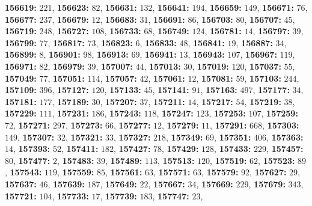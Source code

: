 \textsf{\bfseries 156619:} $221$, \textsf{\bfseries 156623:} $82$, \textsf{\bfseries 156631:} $132$, \textsf{\bfseries 156641:} $194$, \textsf{\bfseries 156659:} $149$, \textsf{\bfseries 156671:} $76$, \textsf{\bfseries 156677:} $237$, \textsf{\bfseries 156679:} $12$, \textsf{\bfseries 156683:} $31$, \textsf{\bfseries 156691:} $86$, \textsf{\bfseries 156703:} $80$, \textsf{\bfseries 156707:} $45$, \textsf{\bfseries 156719:} $248$, \textsf{\bfseries 156727:} $108$, \textsf{\bfseries 156733:} $68$, \textsf{\bfseries 156749:} $124$, \textsf{\bfseries 156781:} $14$, \textsf{\bfseries 156797:} $39$, \textsf{\bfseries 156799:} $77$, \textsf{\bfseries 156817:} $73$, \textsf{\bfseries 156823:} $6$, \textsf{\bfseries 156833:} $48$, \textsf{\bfseries 156841:} $19$, \textsf{\bfseries 156887:} $34$, \textsf{\bfseries 156899:} $8$, \textsf{\bfseries 156901:} $98$, \textsf{\bfseries 156913:} $69$, \textsf{\bfseries 156941:} $13$, \textsf{\bfseries 156943:} $107$, \textsf{\bfseries 156967:} $119$, \textsf{\bfseries 156971:} $82$, \textsf{\bfseries 156979:} $39$, \textsf{\bfseries 157007:} $44$, \textsf{\bfseries 157013:} $30$, \textsf{\bfseries 157019:} $120$, \textsf{\bfseries 157037:} $55$, \textsf{\bfseries 157049:} $77$, \textsf{\bfseries 157051:} $114$, \textsf{\bfseries 157057:} $42$, \textsf{\bfseries 157061:} $12$, \textsf{\bfseries 157081:} $59$, \textsf{\bfseries 157103:} $244$, \textsf{\bfseries 157109:} $396$, \textsf{\bfseries 157127:} $120$, \textsf{\bfseries 157133:} $45$, \textsf{\bfseries 157141:} $91$, \textsf{\bfseries 157163:} $497$, \textsf{\bfseries 157177:} $34$, \textsf{\bfseries 157181:} $177$, \textsf{\bfseries 157189:} $30$, \textsf{\bfseries 157207:} $37$, \textsf{\bfseries 157211:} $14$, \textsf{\bfseries 157217:} $54$, \textsf{\bfseries 157219:} $38$, \textsf{\bfseries 157229:} $111$, \textsf{\bfseries 157231:} $186$, \textsf{\bfseries 157243:} $118$, \textsf{\bfseries 157247:} $123$, \textsf{\bfseries 157253:} $107$, \textsf{\bfseries 157259:} $72$, \textsf{\bfseries 157271:} $297$, \textsf{\bfseries 157273:} $66$, \textsf{\bfseries 157277:} $12$, \textsf{\bfseries 157279:} $11$, \textsf{\bfseries 157291:} $668$, \textsf{\bfseries 157303:} $149$, \textsf{\bfseries 157307:} $32$, \textsf{\bfseries 157321:} $33$, \textsf{\bfseries 157327:} $218$, \textsf{\bfseries 157349:} $69$, \textsf{\bfseries 157351:} $406$, \textsf{\bfseries 157363:} $14$, \textsf{\bfseries 157393:} $52$, \textsf{\bfseries 157411:} $182$, \textsf{\bfseries 157427:} $78$, \textsf{\bfseries 157429:} $128$, \textsf{\bfseries 157433:} $229$, \textsf{\bfseries 157457:} $80$, \textsf{\bfseries 157477:} $2$, \textsf{\bfseries 157483:} $39$, \textsf{\bfseries 157489:} $113$, \textsf{\bfseries 157513:} $120$, \textsf{\bfseries 157519:} $62$, \textsf{\bfseries 157523:} $89$, \textsf{\bfseries 157543:} $119$, \textsf{\bfseries 157559:} $85$, \textsf{\bfseries 157561:} $63$, \textsf{\bfseries 157571:} $63$, \textsf{\bfseries 157579:} $92$, \textsf{\bfseries 157627:} $29$, \textsf{\bfseries 157637:} $46$, \textsf{\bfseries 157639:} $187$, \textsf{\bfseries 157649:} $22$, \textsf{\bfseries 157667:} $34$, \textsf{\bfseries 157669:} $229$, \textsf{\bfseries 157679:} $343$, \textsf{\bfseries 157721:} $104$, \textsf{\bfseries 157733:} $17$, \textsf{\bfseries 157739:} $183$, \textsf{\bfseries 157747:} $23$, 
